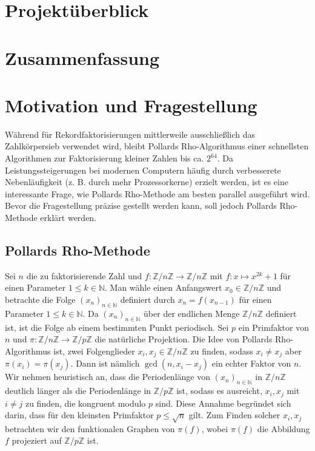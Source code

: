 \documentclass[a4paper, 10pt, ngerman]{article}
\title{\sffamily{\textbf{Parametrisierung von Pollards Rho-Methode}}}
\author{Finn Rudolph}
\date{03.01.2024}
\newcommand{\N}{\mathbb{N}}
\newcommand{\Z}{\mathbb{Z}}
\begin{document}
\maketitle

\section*{Projektüberblick}

\tableofcontents

\section{Zusammenfassung}

\section{Motivation und Fragestellung}

Während für Rekordfaktorisierungen mittlerweile ausschließlich das Zahlkörpersieb verwendet wird, bleibt Pollards Rho-Algorithmus einer schnellsten Algorithmen zur Faktorisierung kleiner Zahlen bis ca. $2^{64}$. Da Leistungssteigerungen bei modernen Computern häufig durch verbesserete Nebenläufigkeit (z. B. durch mehr Prozessorkerne) erzielt werden, ist es eine interessante Frage, wie Pollards Rho-Methode am besten parallel ausgeführt wird. Bevor die Fragestellung präzise gestellt werden kann, soll jedoch Pollards Rho-Methode erklärt werden.

\subsection{Pollards Rho-Methode}

Sei $n$ die zu faktorisierende Zahl und $f : \Z/n\Z \to \Z/n\Z$ mit $f : x \mapsto x^{2k} + 1$ für einen Parameter $1 \le k \in \N$. Man wähle einen Anfangswert $x_0 \in \Z/n\Z$ und betrachte die Folge $(x_n)_{n \in \N}$ definiert durch $x_n = f(x_{n - 1})$ für einen Parameter $1 \le k \in \N$. Da $(x_n)_{n \in \N}$ über der endlichen Menge $\Z/n\Z$ definiert ist, ist die Folge ab einem bestimmten Punkt periodisch. Sei $p$ ein Primfaktor von $n$ und $\pi : \Z/n\Z \to \Z/p\Z$ die natürliche Projektion. Die Idee von Pollards Rho-Algorithmus ist, zwei Folgenglieder $x_i, x_j \in \Z/n\Z$ zu finden, sodass $x_i \ne x_j$ aber $\pi(x_i) = \pi(x_j)$. Dann ist nämlich $\gcd(n, x_i - x_j)$ ein echter Faktor von $n$. Wir nehmen heuristisch an, dass die Periodenlänge von $(x_n)_{n \in \N}$ in $\Z/n\Z$ deutlich länger als die Periodenlänge in $\Z/p\Z$ ist, sodass es ausreicht, $x_i, x_j$ mit $i \ne j$ zu finden, die kongruent modulo $p$ sind. Diese Annahme begründet sich darin, dass für den kleinsten Primfaktor $p \le \sqrt n$ gilt. Zum Finden solcher $x_i, x_j$ betrachten wir den funktionalen Graphen von $\pi(f)$, wobei $\pi(f)$ die Abbildung $f$ projeziert auf $\Z/p\Z$ ist.
\end{document}

